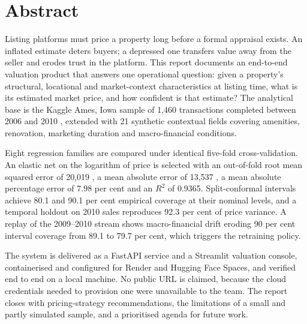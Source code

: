 \section*{Abstract}

Listing platforms must price a property long before a formal appraisal exists. An
inflated estimate deters buyers; a depressed one transfers value away from the seller
and erodes trust in the platform. This report documents an end-to-end valuation
product that answers one operational question: given a property's structural,
locational and market-context characteristics at listing time, what is its estimated
market price, and how confident is that estimate? The analytical base is the Kaggle
Ames, Iowa sample of 1,460 transactions completed between 2006 and 2010
\citep{decock2011,kaggle2016}, extended with 21 synthetic contextual fields covering
amenities, renovation, marketing duration and macro-financial conditions.

Eight regression families are compared under identical five-fold cross-validation.
An elastic net on the logarithm of price is selected with an out-of-fold root mean
squared error of 20,019 \USD, a mean absolute error of 13,537 \USD, a mean absolute
percentage error of 7.98 per cent and an $R^2$ of 0.9365. Split-conformal intervals
achieve 80.1 and 90.1 per cent empirical coverage at their nominal levels, and a
temporal holdout on 2010 sales reproduces 92.3 per cent of price variance. A replay
of the 2009--2010 stream shows macro-financial drift eroding 90 per cent interval
coverage from 89.1 to 79.7 per cent, which triggers the retraining policy.

The system is delivered as a FastAPI service and a Streamlit valuation console,
containerised and configured for Render and Hugging Face Spaces, and verified end to
end on a local machine. No public URL is claimed, because the cloud credentials
needed to provision one were unavailable to the team. The report closes with
pricing-strategy recommendations, the limitations of a small and partly simulated
sample, and a prioritised agenda for future work.

